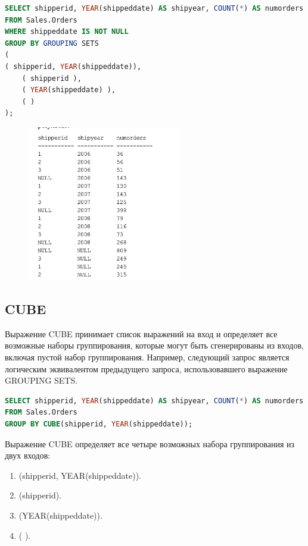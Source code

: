 \begin{lstlisting}[label=lst:funcReturn, language=sql]
SELECT shipperid, YEAR(shippeddate) AS shipyear, COUNT(*) AS numorders
FROM Sales.Orders
WHERE shippeddate IS NOT NULL
GROUP BY GROUPING SETS
(
( shipperid, YEAR(shippeddate)),
	( shipperid ),
	( YEAR(shippeddate) ),
	( )
); 
\end{lstlisting}


\begin{figure}[h!]
	\begin{center}
		\includegraphics[width=0.6\textwidth]{img/res11.png}
	\end{center}
	\captionsetup{justification=centering}
\end{figure}

\subsection{CUBE}
Выражение CUBE принимает список выражений на вход и определяет
все возможные наборы группирования, которые могут быть сгенерированы из входов, включая пустой набор группирования. Например, следующий запрос является
логическим эквивалентом предыдущего запроса, использовавшего выражение
GROUPING SETS. 

\begin{lstlisting}[label=lst:funcReturn, language=sql]
SELECT shipperid, YEAR(shippeddate) AS shipyear, COUNT(*) AS numorders
FROM Sales.Orders
GROUP BY CUBE(shipperid, YEAR(shippeddate));
\end{lstlisting}

Выражение CUBE определяет все четыре возможных набора группирования из двух
входов: 

\begin{enumerate}
	\item (shipperid, YEAR(shippeddate)). 
	\item (shipperid). 
	\item (YEAR(shippeddate)). 
	\item ( ). 
\end{enumerate}

